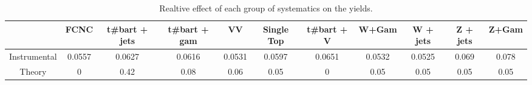 \begin{table}[htbp]
\begin{center}
\begin{tabular}{|c|c|c|c|c|c|c|c|c|c|c|}
\hline 
      & FCNC      & t#bar{t} + jets      & t#bar{t} +  gam      & VV      & Single Top      & t#bar{t} + V      & W+Gam      & W + jets      & Z + jets      & Z+Gam \\ 
\hline 
 Instrumental & 0.0557 & 0.0627 & 0.0616 & 0.0531 & 0.0597 & 0.0651 & 0.0532 & 0.0525 & 0.069 & 0.078 \\ 
 Theory & 0 & 0.42 & 0.08 & 0.06 & 0.05 & 0 & 0.05 & 0.05 & 0.05 & 0.05 \\ 
\hline 
\end{tabular} 
\caption{Realtive effect of each group of systematics on the yields.} 
\end{center} 
\end{table} 
